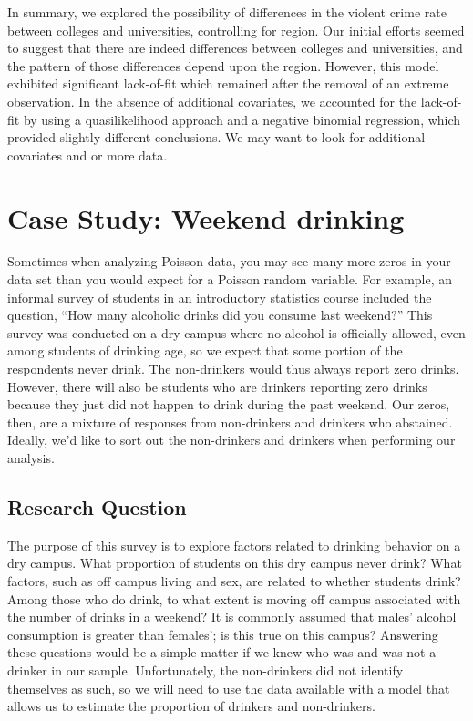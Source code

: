 \documentclass[
]{krantz}
\begin{document}
In summary, we explored the possibility of differences in the violent crime rate between colleges and universities, controlling for region. Our initial efforts seemed to suggest that there are indeed differences between colleges and universities, and the pattern of those differences depend upon the region. However, this model exhibited significant lack-of-fit which remained after the removal of an extreme observation. In the absence of additional covariates, we accounted for the lack-of-fit by using a quasilikelihood approach and a negative binomial regression, which provided slightly different conclusions. We may want to look for additional covariates and or more data.

\hypertarget{cs:drinking}{%
\section{Case Study: Weekend drinking}\label{cs:drinking}}

Sometimes when analyzing Poisson data, you may see many more zeros in your data set than you would expect for a Poisson random variable. For example, an informal survey of students in an introductory statistics course included the question, ``How many alcoholic drinks did you consume last weekend?'' This survey was conducted on a dry campus where no alcohol is officially allowed, even among students of drinking age, so we expect that some portion of the respondents never drink. The non-drinkers would thus always report zero drinks. However, there will also be students who are drinkers reporting zero drinks because they just did not happen to drink during the past weekend. Our zeros, then, are a mixture of responses from non-drinkers and drinkers who abstained. Ideally, we'd like to sort out the non-drinkers and drinkers when performing our analysis.

\hypertarget{research-question}{%
\subsection{Research Question}\label{research-question}}

The purpose of this survey is to explore factors related to drinking behavior on a dry campus. What proportion of students on this dry campus never drink? What factors, such as off campus living and sex, are related to whether students drink? Among those who do drink, to what extent is moving off campus associated with the number of drinks in a weekend? It is commonly assumed that males' alcohol consumption is greater than females'; is this true on this campus? Answering these questions would be a simple matter if we knew who was and was not a drinker in our sample. Unfortunately, the non-drinkers did not identify themselves as such, so we will need to use the data available with a model that allows us to estimate the proportion of drinkers and non-drinkers.
\end{document}
